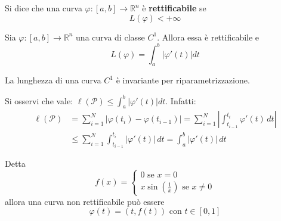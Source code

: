 \begin{definition}
    Si dice che una curva $\varphi: [a,b] \to \mathbb{R}^n$ è \textbf{rettificabile} se 
    \begin{equation}
    L(\varphi)<+\infty
    \end{equation}
\end{definition}
\begin{theorem}
Sia $\varphi: [a,b] \to \mathbb{R}^n$ una curva di classe $C^1$. Allora essa è rettificabile e 
\begin{equation}
    L(\varphi)=\int_{a}^{b}{|\varphi'(t)|dt}
\end{equation}
\end{theorem}
\begin{oss}
    La lunghezza di una curva $C^1$ è invariante per riparametrizzazione.
\end{oss}
\begin{oss}
    Si osservi che vale: $\ell(\mathcal{P})\leq \int_{a}^{b}{|\varphi'(t)|dt}$. Infatti:
    \begin{equation}
        \begin{aligned}
            \ell(\mathcal{P}) &= \sum\limits_{i=1}^{N} \left| \varphi(t_i) - \varphi(t_{i-1}) \right|= \sum\limits_{i=1}^{N} \left\lvert \int_{t_{i-1}}^{t_i} \varphi'(t) \, dt \right\rvert \\
            &\leq \sum\limits_{i=1}^{N} \int_{t_{i-1}}^{t_i} \left\lvert \varphi'(t) \right\rvert \, dt = \int_{a}^{b} \left\lvert \varphi'(t) \right\rvert \, dt
        \end{aligned}
    \end{equation}
\end{oss}
\begin{example}
    Detta 
    \begin{equation*}
        f(x)= \begin{cases}
            0 \text{ se } x=0\\ x\sin\left(\frac{1}{x}\right) \text{ se } x\neq 0
        \end{cases}
    \end{equation*}
    allora una curva non rettificabile può essere 
    \begin{equation*}
        \varphi(t)=(t, f(t)) \text{ con } t\in[0,1]
    \end{equation*}
\end{example}
